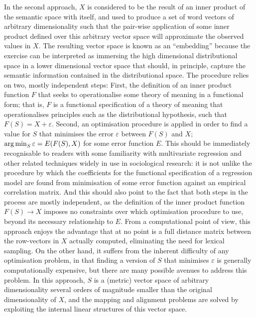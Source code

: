 In the second approach, $X$ is considered to be the result of an inner product of the semantic space with itself, and used to produce a set of word vectors of arbitrary dimensionality such that the pair-wise application of some inner product defined over this arbitrary vector space will approximate the observed values in $X$.
The resulting vector space is known as an ``embedding'' because the exercise can be interpreted as immersing the high dimensional distributional space in a lower dimensional vector space that should, in principle, capture the semantic information contained in the distributional space.
The procedure relies on two, mostly independent steps:
First, the definition of an inner product function $F$ that seeks to operationalise some theory of meaning in a functional form; that is, $F$ is a functional specification of a theory of meaning that operationalises principles such as the distributional hypothesis, such that $F(S) = X + \varepsilon$.
Second, an optimisation procedure is applied in order to find a value for $S$ that minimises the error $\varepsilon$ between $F(S)$ and $X$; $\operatorname*{arg\,min}_S \varepsilon = E(F(S),X)$ for some error function $E$.
This should be immediately recognisable to readers with some familiarity with multivariate regression and other related techniques widely in use in sociological research: it is not unlike the procedure by which the coefficients for the functional specification of a regression model are found from minimisation of some error function against an empirical correlation matrix.
And this should also point to the fact that both steps in the process are mostly independent, as the definition of the inner product function $F(S) \rightarrow X$ imposes no constraints over which optimisation procedure to use, beyond its necessary relationship to $E$.
From a computational point of view, this approach enjoys the advantage that at no point is a full distance matrix between the row-vectors in $X$ actually computed, eliminating the need for lexical sampling.
On the other hand, it suffers from the inherent difficulty of any optimisation problem, in that finding a version of $S$ that minimises $\varepsilon$ is generally computationally expensive, but there are many possible avenues to address this problem.
In this approach, $S$ is a (metric) vector space of arbitrary dimensionality several orders of magnitude smaller than the original dimensionality of $X$, and the mapping and alignment problems are solved by exploiting the internal linear structures of this vector space.

